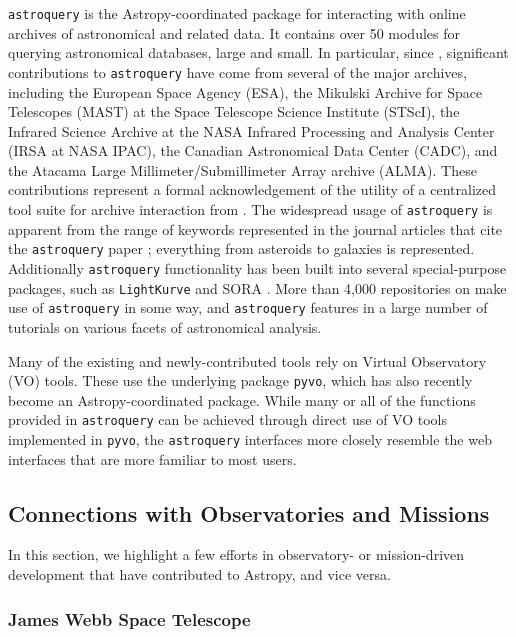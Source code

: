 \documentclass[modern]{aastex631}
\newcommand{\secauthor}[1]{{\color{blue}Author:~\textit{#1}}}
\begin{document}
\texttt{astroquery} \citep{Ginsburg2019} is the Astropy-coordinated package for
interacting with online archives of astronomical and related data. It contains
over 50 modules for querying astronomical databases, large and small. In
particular, since \paperii, significant contributions to \texttt{astroquery}
have come from several of the major archives, including the European Space
Agency (ESA), the Mikulski Archive for Space Telescopes (MAST) at the Space
Telescope Science Institute (STScI), the Infrared Science Archive at the NASA
Infrared Processing and Analysis Center (IRSA at NASA IPAC), the Canadian
Astronomical Data Center (CADC), and the Atacama Large Millimeter/Submillimeter
Array archive (ALMA). These contributions represent a formal acknowledgement of
the utility of a centralized tool suite for archive interaction from \python.
The widespread usage of \texttt{astroquery} is apparent from the range of
keywords represented in the journal articles that cite the \texttt{astroquery}
paper \citep{Ginsburg2019}; everything from asteroids to galaxies is
represented. Additionally \texttt{astroquery} functionality has been built into
several special-purpose \python packages, such as \texttt{LightKurve}
\citep{LightKurve} and SORA \citep{SORA}. More than 4,000 repositories on
\github make use of \texttt{astroquery} in some way, and \texttt{astroquery}
features in a large number of tutorials on various facets of astronomical
analysis.

Many of the existing and newly-contributed tools rely on Virtual Observatory
(VO) tools. These use the underlying package \texttt{pyvo}, which has also
recently become an Astropy-coordinated package. While many or all of the
functions provided in \texttt{astroquery} can be achieved through direct use of
VO tools implemented in \texttt{pyvo}, the \texttt{astroquery} interfaces more
closely resemble the web interfaces that are more familiar to most users.

\subsection{Connections with Observatories and Missions}

In this section, we highlight a few efforts in observatory- or mission-driven
development that have contributed to Astropy, and vice versa.

\subsubsection{James Webb Space Telescope}
\end{document}
